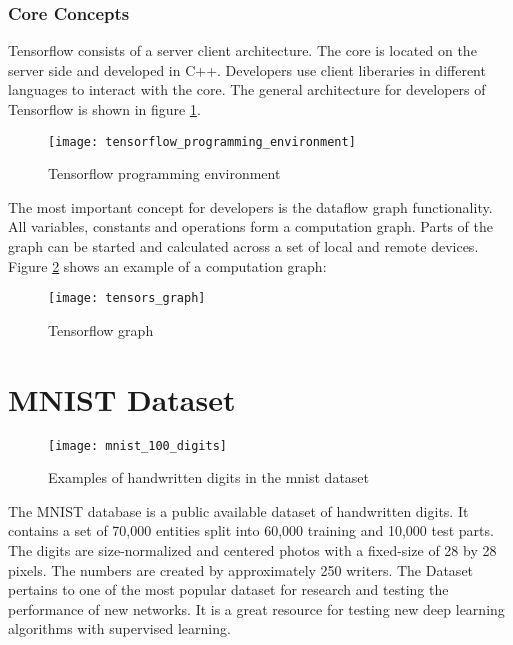 \subsubsection*{Core Concepts}

Tensorflow consists of a server client architecture.
The core is located on the server side and developed in C++.
Developers use client liberaries in different languages to interact with the core.
The general architecture for developers of Tensorflow is shown in figure \ref{fig:tensorflow_programming_environment_image}.

\begin{figure}[H]
    \centering
    \texttt{[image: tensorflow\_programming\_environment]}
    \caption{\cite{tensorflow_programming_environment_image} Tensorflow programming environment}
    \label{fig:tensorflow_programming_environment_image}
\end{figure}

The most important concept for developers is the dataflow graph functionality.
All variables, constants and operations form a computation graph.
Parts of the graph can be started and calculated across a set of local and remote devices.
Figure \ref{fig:tensorflow_graph_image} shows an example of a computation graph:

\begin{figure}[H]
    \centering
    \texttt{[image: tensors\_graph]}
    \caption{\cite{tensorflow_graph_image} Tensorflow graph}
    \label{fig:tensorflow_graph_image}
\end{figure}

\section{MNIST Dataset}

\begin{figure}[H]
    \centering
    \texttt{[image: mnist\_100\_digits]}
    \caption{\cite{mnist_examples_image} Examples of handwritten digits in the mnist dataset}
    \label{fig:mnist_examples}
\end{figure}

The MNIST database is a public available dataset of handwritten digits.
It contains a set of 70,000 entities split into 60,000 training and 10,000 test parts.
The digits are size-normalized and centered photos with a fixed-size of 28 by 28 pixels.
The numbers are created by approximately 250 writers. 
\cite{mnist-database}
The Dataset pertains to one of the most popular dataset for research and testing the performance of new networks.
It is a great resource for testing new deep learning algorithms with supervised learning.

